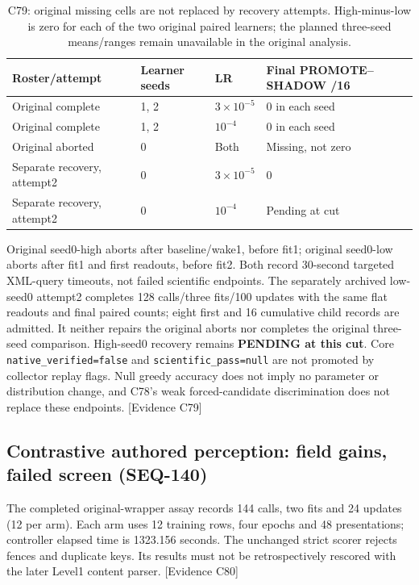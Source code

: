 \documentclass[11pt]{article}
\begin{document}
\begin{table}[htbp]
\centering\small
\begin{tabular}{llll}
\toprule
Roster/attempt & Learner seeds & LR & Final PROMOTE--SHADOW /16 \\
\midrule
Original complete & 1, 2 & $3\times10^{-5}$ & 0 in each seed \\
Original complete & 1, 2 & $10^{-4}$ & 0 in each seed \\
Original aborted & 0 & Both & Missing, not zero \\
Separate recovery, attempt2 & 0 & $3\times10^{-5}$ & 0 \\
Separate recovery, attempt2 & 0 & $10^{-4}$ & Pending at cut \\
\bottomrule
\end{tabular}
\caption{C79: original missing cells are not replaced by recovery attempts.
High-minus-low is zero for each of the two original paired learners; the planned
three-seed means/ranges remain unavailable in the original analysis.}
\label{tab:bounded-lr}
\end{table}

Original seed0-high aborts after baseline/wake1, before fit1; original seed0-low
aborts after fit1 and first readouts, before fit2. Both record 30-second targeted
XML-query timeouts, not failed scientific endpoints. The separately archived
low-seed0 attempt2 completes 128 calls/three fits/100 updates with the same flat
readouts and final paired counts; eight first and 16 cumulative child records
are admitted. It neither repairs the original aborts nor completes the original
three-seed comparison. High-seed0 recovery remains \textbf{PENDING at this cut}.
Core \texttt{native\_verified=false} and \texttt{scientific\_pass=null} are not
promoted by collector replay flags. Null greedy accuracy does not imply no
parameter or distribution change, and C78's weak forced-candidate discrimination
does not replace these endpoints. \textsf{[Evidence C79]}

\subsection{Contrastive authored perception: field gains, failed screen (SEQ-140)}
\label{sec:bounded-contrastive}
The completed original-wrapper assay records 144 calls, two fits and 24 updates
(12 per arm). Each arm uses 12 training rows, four epochs and 48 presentations;
controller elapsed time is 1323.156 seconds. The unchanged strict scorer rejects
fences and duplicate keys. Its results must not be retrospectively rescored with
the later Level1 content parser. \textsf{[Evidence C80]}
\end{document}
